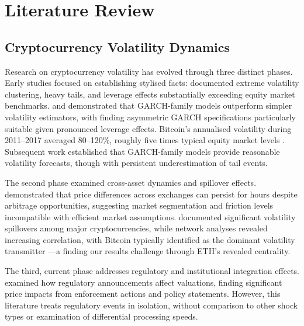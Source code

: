 \documentclass[pdflatex,sn-mathphys-num]{sn-jnl}
\theoremstyle{thmstyleone}
\theoremstyle{thmstyletwo}
\theoremstyle{thmstylethree}
\begin{document}

\section{Literature Review}\label{sec:literature}

\subsection{Cryptocurrency Volatility Dynamics}

Research on cryptocurrency volatility has evolved through three distinct phases. Early studies focused on establishing stylised facts: \citet{CorbetEtAl2019} documented extreme volatility clustering, heavy tails, and leverage effects substantially exceeding equity market benchmarks. \citet{Katsiampa2017} and \citet{ChuEtAl2017} demonstrated that GARCH-family models outperform simpler volatility estimators, with \citet{CheikhEtAl2020} finding asymmetric GARCH specifications particularly suitable given pronounced leverage effects. Bitcoin's annualised volatility during 2011--2017 averaged 80--120\%, roughly five times typical equity market levels \citep{BaurDimpfl2018}. Subsequent work established that GARCH-family models provide reasonable volatility forecasts, though with persistent underestimation of tail events.

The second phase examined cross-asset dynamics and spillover effects. \citet{MakarovSchoar2020} demonstrated that price differences across exchanges can persist for hours despite arbitrage opportunities, suggesting market segmentation and friction levels incompatible with efficient market assumptions. \citet{BouriEtAl2017} documented significant volatility spillovers among major cryptocurrencies, while network analyses revealed increasing correlation, with Bitcoin typically identified as the dominant volatility transmitter \citep{KimEtAl2021}---a finding our results challenge through ETH's revealed centrality.

The third, current phase addresses regulatory and institutional integration effects. \citet{AuerClaessens2018} examined how regulatory announcements affect valuations, finding significant price impacts from enforcement actions and policy statements. However, this literature treats regulatory events in isolation, without comparison to other shock types or examination of differential processing speeds.
\end{document}
